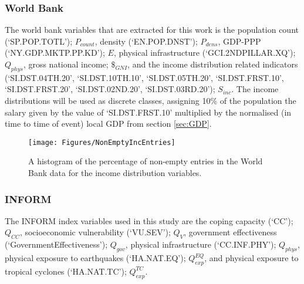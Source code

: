 \documentclass[10pt,a4paper]{article}
\begin{document}
\begin{multicols}{1}
\subsubsection{World Bank}\label{sec:WB}
The world bank variables that are extracted for this work is the population count (`SP.POP.TOTL'); $P_{count}$, density (`EN.POP.DNST'); $P_{dens}$, GDP-PPP (`NY.GDP.MKTP.PP.KD'); $E$, physical infrastructure (`GCI.2NDPILLAR.XQ'); $Q_{phys}$, gross national income; $\$_{GNI}$, and the income distribution related indicators (`SI.DST.04TH.20', `SI.DST.10TH.10', `SI.DST.05TH.20', `SI.DST.FRST.10', `SI.DST.FRST.20', `SI.DST.02ND.20', `SI.DST.03RD.20'); $S_{inc}$. The income distributions will be used as discrete classes, assigning 10\% of the population the salary given by the value of `SI.DST.FRST.10' multiplied by the normalised (in time to time of event) local GDP from section \ref{sec:GDP}.
\begin{figure}[H]
   \texttt{[image: Figures/NonEmptyIncEntries]}
 	\caption{A histogram of the percentage of non-empty entries in the World Bank data for the income distribution variables.}
 	\label{fig:WBinc}
\end{figure}
\subsubsection{INFORM}\label{sec:INFORM}
The INFORM index variables used in this study are the coping capacity (`CC'); $Q_{CC}$, socioeconomic vulnerability (`VU.SEV'); $Q_V$, government effectiveness (`GovernmentEffectiveness'); $Q_{gov}$, physical infrastructure (`CC.INF.PHY'); $Q_{phys}$, physical exposure to earthquakes (`HA.NAT.EQ'); $Q_{exp}^{EQ}$, and physical exposure to tropical cyclones (`HA.NAT.TC'); $Q_{exp}^{TC}$.

\end{multicols}
\end{document}
